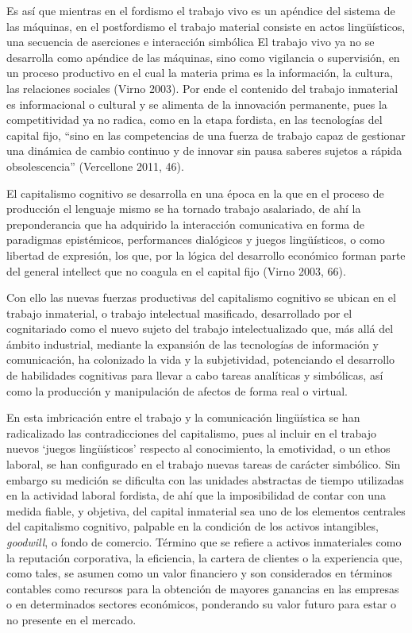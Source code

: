 \documentclass[
]{interact}
\begin{document}
Es así que mientras en el fordismo el trabajo vivo es un apéndice del
sistema de las máquinas, en el postfordismo el trabajo material consiste
en actos lingüísticos, una secuencia de aserciones e interacción
simbólica El trabajo vivo ya no se desarrolla como apéndice de las
máquinas, sino como vigilancia o supervisión, en un proceso productivo
en el cual la materia prima es la información, la cultura, las
relaciones sociales (Virno 2003). Por ende el contenido del trabajo
inmaterial es informacional o cultural y se alimenta de la innovación
permanente, pues la competitividad ya no radica, como en la etapa
fordista, en las tecnologías del capital fijo, ``sino en las
competencias de una fuerza de trabajo capaz de gestionar una dinámica de
cambio continuo y de innovar sin pausa saberes sujetos a rápida
obsolescencia'' (Vercellone 2011, 46).

El capitalismo cognitivo se desarrolla en una época en la que en el
proceso de producción el lenguaje mismo se ha tornado trabajo
asalariado, de ahí la preponderancia que ha adquirido la interacción
comunicativa en forma de paradigmas epistémicos, performances dialógicos
y juegos lingüísticos, o como libertad de expresión, los que, por la
lógica del desarrollo económico forman parte del general intellect que
no coagula en el capital fijo (Virno 2003, 66).

Con ello las nuevas fuerzas productivas del capitalismo cognitivo se
ubican en el trabajo inmaterial, o trabajo intelectual masificado,
desarrollado por el cognitariado como el nuevo sujeto del trabajo
intelectualizado que, más allá del ámbito industrial, mediante la
expansión de las tecnologías de información y comunicación, ha
colonizado la vida y la subjetividad, potenciando el desarrollo de
habilidades cognitivas para llevar a cabo tareas analíticas y
simbólicas, así como la producción y manipulación de afectos de forma
real o virtual.

En esta imbricación entre el trabajo y la comunicación lingüística se
han radicalizado las contradicciones del capitalismo, pues al incluir en
el trabajo nuevos `juegos lingüísticos' respecto al conocimiento, la
emotividad, o un ethos laboral, se han configurado en el trabajo nuevas
tareas de carácter simbólico. Sin embargo su medición se dificulta con
las unidades abstractas de tiempo utilizadas en la actividad laboral
fordista, de ahí que la imposibilidad de contar con una medida fiable, y
objetiva, del capital inmaterial sea uno de los elementos centrales del
capitalismo cognitivo, palpable en la condición de los activos
intangibles, \emph{goodwill}, o fondo de comercio. Término que se
refiere a activos inmateriales como la reputación corporativa, la
eficiencia, la cartera de clientes o la experiencia que, como tales, se
asumen como un valor financiero y son considerados en términos contables
como recursos para la obtención de mayores ganancias en las empresas o
en determinados sectores económicos, ponderando su valor futuro para
estar o no presente en el mercado.
\end{document}
